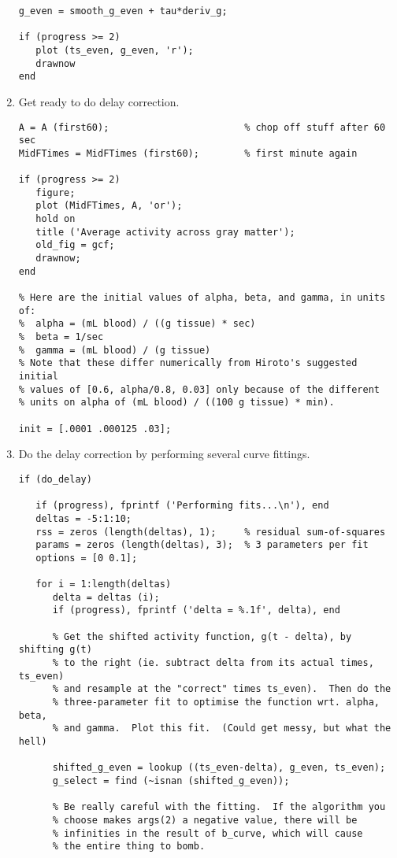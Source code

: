 \begin{enumerate}
\begin{verbatim}
g_even = smooth_g_even + tau*deriv_g;

if (progress >= 2)
   plot (ts_even, g_even, 'r');
   drawnow
end
\end{verbatim}

\item Get ready to do delay correction.
\begin{verbatim}
A = A (first60);                        % chop off stuff after 60 sec
MidFTimes = MidFTimes (first60);        % first minute again

if (progress >= 2)
   figure;
   plot (MidFTimes, A, 'or');
   hold on
   title ('Average activity across gray matter');
   old_fig = gcf;
   drawnow;
end

% Here are the initial values of alpha, beta, and gamma, in units of:
%  alpha = (mL blood) / ((g tissue) * sec)
%  beta = 1/sec
%  gamma = (mL blood) / (g tissue)
% Note that these differ numerically from Hiroto's suggested initial
% values of [0.6, alpha/0.8, 0.03] only because of the different
% units on alpha of (mL blood) / ((100 g tissue) * min).

init = [.0001 .000125 .03];
\end{verbatim}

\item Do the delay correction by performing several curve fittings.
\begin{verbatim}
if (do_delay)

   if (progress), fprintf ('Performing fits...\n'), end
   deltas = -5:1:10;
   rss = zeros (length(deltas), 1);     % residual sum-of-squares
   params = zeros (length(deltas), 3);  % 3 parameters per fit
   options = [0 0.1];

   for i = 1:length(deltas)
      delta = deltas (i);
      if (progress), fprintf ('delta = %.1f', delta), end

      % Get the shifted activity function, g(t - delta), by shifting g(t)
      % to the right (ie. subtract delta from its actual times, ts_even)
      % and resample at the "correct" times ts_even).  Then do the 
      % three-parameter fit to optimise the function wrt. alpha, beta,
      % and gamma.  Plot this fit.  (Could get messy, but what the hell)

      shifted_g_even = lookup ((ts_even-delta), g_even, ts_even);
      g_select = find (~isnan (shifted_g_even));

      % Be really careful with the fitting.  If the algorithm you
      % choose makes args(2) a negative value, there will be
      % infinities in the result of b_curve, which will cause
      % the entire thing to bomb.


\end{verbatim}
\end{enumerate}
